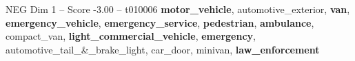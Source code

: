 \begin{textsample}{NEG Dim 1 – Score -3.00 – t010006}  \label{ex:f1_neg_038}
\textbf{motor\_vehicle}, automotive\_exterior, \textbf{van}, \textbf{emergency\_vehicle}, \textbf{emergency\_service}, \textbf{pedestrian}, \textbf{ambulance}, compact\_van, \textbf{light\_commercial\_vehicle}, \textbf{emergency}, automotive\_tail\_\&\_brake\_light, car\_door, minivan, \textbf{law\_enforcement}

\end{textsample}
